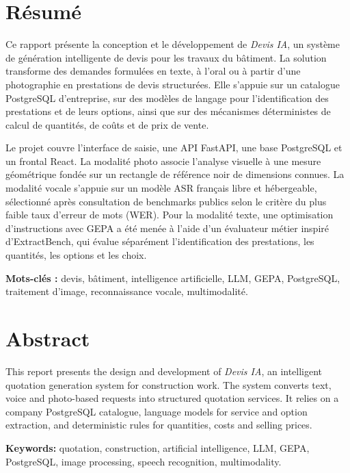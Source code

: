 \section*{Résumé}
Ce rapport présente la conception et le développement de \textit{Devis IA}, un système de génération intelligente de devis pour les travaux du bâtiment. La solution transforme des demandes formulées en texte, à l'oral ou à partir d'une photographie en prestations de devis structurées. Elle s'appuie sur un catalogue PostgreSQL d'entreprise, sur des modèles de langage pour l'identification des prestations et de leurs options, ainsi que sur des mécanismes déterministes de calcul de quantités, de coûts et de prix de vente.

Le projet couvre l'interface de saisie, une API FastAPI, une base PostgreSQL et un frontal React. La modalité photo associe l'analyse visuelle à une mesure géométrique fondée sur un rectangle de référence noir de dimensions connues. La modalité vocale s'appuie sur un modèle ASR français libre et hébergeable, sélectionné après consultation de benchmarks publics selon le critère du plus faible taux d'erreur de mots (WER). Pour la modalité texte, une optimisation d'instructions avec GEPA a été menée à l'aide d'un évaluateur métier inspiré d'ExtractBench, qui évalue séparément l'identification des prestations, les quantités, les options et les choix.

\noindent\textbf{Mots-clés :} devis, bâtiment, intelligence artificielle, LLM, GEPA, PostgreSQL, traitement d'image, reconnaissance vocale, multimodalité.

\section*{Abstract}
This report presents the design and development of \textit{Devis IA}, an intelligent quotation generation system for construction work. The system converts text, voice and photo-based requests into structured quotation services. It relies on a company PostgreSQL catalogue, language models for service and option extraction, and deterministic rules for quantities, costs and selling prices.

\noindent\textbf{Keywords:} quotation, construction, artificial intelligence, LLM, GEPA, PostgreSQL, image processing, speech recognition, multimodality.

